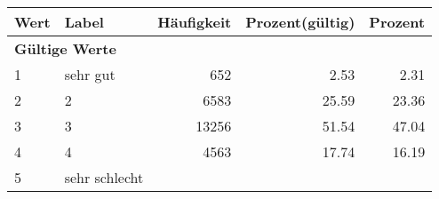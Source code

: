      \begin{longtable}{lXrrr}
     \toprule
     \textbf{Wert} & \textbf{Label} & \textbf{Häufigkeit} & \textbf{Prozent(gültig)} & \textbf{Prozent} \\
     \endhead
     \midrule
     \multicolumn{5}{l}{\textbf{Gültige Werte}}\\

     1 &
     \multicolumn{1}{X}{ sehr gut   } &


       \num{652} &
       \num[round-mode=places,round-precision=2]{2,53} &
         \num[round-mode=places,round-precision=2]{2,31} \\

     2 &
     \multicolumn{1}{X}{ 2   } &


       \num{6583} &
       \num[round-mode=places,round-precision=2]{25,59} &
         \num[round-mode=places,round-precision=2]{23,36} \\

     3 &
     \multicolumn{1}{X}{ 3   } &


       \num{13256} &
       \num[round-mode=places,round-precision=2]{51,54} &
         \num[round-mode=places,round-precision=2]{47,04} \\

     4 &
     \multicolumn{1}{X}{ 4   } &


       \num{4563} &
       \num[round-mode=places,round-precision=2]{17,74} &
         \num[round-mode=places,round-precision=2]{16,19} \\

     5 &
     \multicolumn{1}{X}{ sehr schlecht   } &



\end{longtable}

